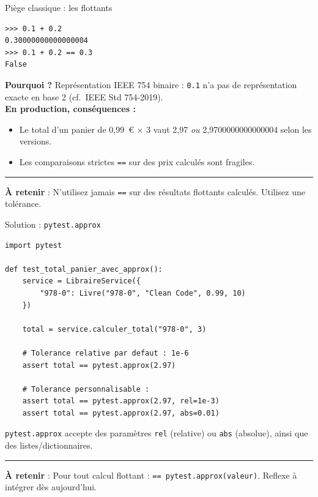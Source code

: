 \documentclass[aspectratio=169,11pt]{beamer}
\newcommand{\takeaway}[1]{%
\vfill\begin{beamercolorbox}[wd=\linewidth,sep=0.4em]{}
\color{accent2}\rule[0.6ex]{1.2em}{1.2pt}\hspace{0.4em}%
\textbf{\color{accent2}\small À retenir} \textcolor{textsoft}{:} %
{\small\color{textmain}#1}
\end{beamercolorbox}}
\begin{document}
\begin{frame}[fragile,t]{Piège classique : les flottants}
\begin{lstlisting}[style=pythondark]
>>> 0.1 + 0.2
0.30000000000000004
>>> 0.1 + 0.2 == 0.3
False
\end{lstlisting}
\vspace{0.3cm}
\textbf{Pourquoi ?} Représentation IEEE 754 binaire : \texttt{0.1} n'a pas de représentation exacte en base 2 (cf.\ IEEE Std 754-2019).\\[0.4em]
\footnotesize
\textbf{En production, conséquences :}
\begin{itemize}\scriptsize
\item Le total d'un panier de 0,99~\euro{} $\times$ 3 vaut 2,97 \textit{ou} 2,9700000000000004 selon les versions.
\item Les comparaisons strictes \texttt{==} sur des prix calculés sont fragiles.
\end{itemize}
\takeaway{N'utilisez jamais \texttt{==} sur des résultats flottants calculés. Utilisez une tolérance.}
\end{frame}

\begin{frame}[fragile,t,shrink=15]{Solution : \texttt{pytest.approx}}
\begin{lstlisting}[style=pythondark]
import pytest

def test_total_panier_avec_approx():
    service = LibraireService({
        "978-0": Livre("978-0", "Clean Code", 0.99, 10)
    })

    total = service.calculer_total("978-0", 3)

    # Tolerance relative par defaut : 1e-6
    assert total == pytest.approx(2.97)

    # Tolerance personnalisable :
    assert total == pytest.approx(2.97, rel=1e-3)
    assert total == pytest.approx(2.97, abs=0.01)
\end{lstlisting}
\vspace{0.3cm}
\footnotesize \texttt{pytest.approx} accepte des paramètres \texttt{rel} (relative) ou \texttt{abs} (absolue), ainsi que des listes/dictionnaires.
\takeaway{Pour tout calcul flottant : \texttt{== pytest.approx(valeur)}. Reflexe à intégrer dès aujourd'hui.}
\end{frame}
\end{document}
